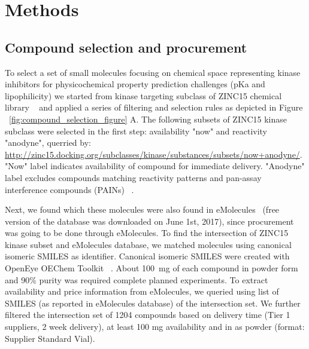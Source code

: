 \documentclass[9pt,lineno]{elife}
\begin{document}

\section{Methods}

\subsection{Compound selection and procurement}
To select a set of small molecules focusing on chemical space representing kinase inhibitors for physicochemical property prediction challenges (pKa and lipophilicity) we started from kinase targeting subclass of ZINC15 chemical library ~\citep{sterling_zinc_2015} and applied a series of filtering and selection rules as depicted in Figure ~\ref{fig:compound_selection_figure} A. The following subsets of ZINC15 kinase subclass were selected in the first step: availability "now" and reactivity "anodyne", querried by:
\url{http://zinc15.docking.org/subclasses/kinase/substances/subsets/now+anodyne/}. "Now" label indicates availability of compound for immediate delivery. "Anodyne" label excludes compounds matching reactivity patterns and pan-assay interference compounds (PAINs) ~\citep{baell_new_2010, saubern_knime_2011}. 

Next, we found which these molecules were also found in eMolecules~\citep{eMolecules_ref_2017} (free version of the database was downloaded on June 1st, 2017), since procurement was going to be done through eMolecules. To find the intersection of ZINC15 kinase subset and eMolecules database, we matched molecules using canonical isomeric SMILES as identifier. Canonical isomeric SMILES were created with OpenEye OEChem Toolkit ~\citep{oechem_openeye_2017}. About 100~mg of each compound in powder form and 90\% purity was required complete planned experiments. To extract availability and price information from eMolecules, we queried using list of SMILES (as reported in eMolecules database) of the intersection set. We further filtered the intersection set of 1204 compounds based on delivery time (Tier 1 suppliers, 2 week delivery), at least 100 mg availability and in as powder (format: Supplier Standard Vial). 
\end{document}
